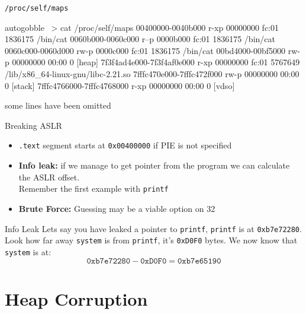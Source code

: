 \documentclass[beamer]{uibk}
\begin{document}
\begin{frame}[fragile]{\texttt{/proc/self/maps}}
    \begin{pre*}{autogobble}
        ~> cat /proc/self/maps
        00400000-0040b000 r-xp 00000000 fc:01 1836175                            /bin/cat
        0060b000-0060c000 r--p 0000b000 fc:01 1836175                            /bin/cat
        0060c000-0060d000 rw-p 0000c000 fc:01 1836175                            /bin/cat
        00bd4000-00bf5000 rw-p 00000000 00:00 0                                  [heap]
        7f3f4ad4e000-7f3f4af0e000 r-xp 00000000 fc:01 5767649                    /lib/x86_64-linux-gnu/libc-2.21.so
        7fffc470e000-7fffc472f000 rw-p 00000000 00:00 0                          [stack]
        7fffc4766000-7fffc4768000 r-xp 00000000 00:00 0                          [vdso]
    \end{pre*}
    \bigskip
    some lines have been omitted
\end{frame}

\begin{frame}{Breaking ASLR}
    \begin{itemize}
        \item \texttt{.text} segment starts at \texttt{0x00400000} if PIE is
            not specified
        \medskip
        \pause
        \item \textbf{Info leak:} if we manage to get pointer from the program
            we can calculate the ASLR offset.\\
            Remember the first example with \texttt{printf}
        \medskip
    \item \textbf{Brute Force:} Guessing may be a viable option on
        \SI{32}{\bit}
    \end{itemize}
\end{frame}

\begin{frame}{Info Leak}
    Lets say you have leaked a pointer to \texttt{printf}, \texttt{printf} is
    at  \texttt{0xb7e72280}.
    \bigskip
    Look how far away \texttt{system} is from \texttt{printf}, it's
    \texttt{0xD0F0} bytes.
    \bigskip
    We now know that \texttt{system} is at:
    \[ \mathtt{0xb7e72280} - \mathtt{0xD0F0} = \mathtt{0xb7e65190} \]
\end{frame}

\section{Heap Corruption}
\end{document}
